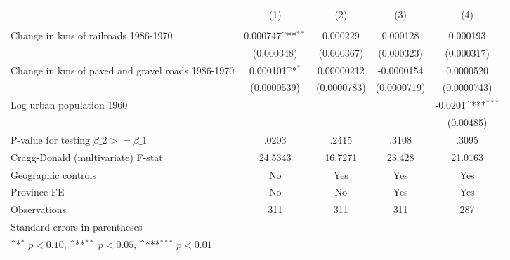 {
\def\sym#1{\ifmmode^{#1}\else\(^{#1}\)\fi}
\begin{tabular}{l*{4}{c}}
\hline\hline
                &\multicolumn{1}{c}{(1)}&\multicolumn{1}{c}{(2)}&\multicolumn{1}{c}{(3)}&\multicolumn{1}{c}{(4)}\\
                &\multicolumn{1}{c}{}&\multicolumn{1}{c}{}&\multicolumn{1}{c}{}&\multicolumn{1}{c}{}\\
\hline
Change in kms of railroads 1986-1970& 0.000747\sym{**} & 0.000229         & 0.000128         & 0.000193         \\
                &(0.000348)         &(0.000367)         &(0.000323)         &(0.000317)         \\
[1em]
Change in kms of paved and gravel roads 1986-1970& 0.000101\sym{*}  &0.00000212         &-0.0000154         &0.0000520         \\
                &(0.0000539)         &(0.0000783)         &(0.0000719)         &(0.0000743)         \\
[1em]
Log urban population 1960&                  &                  &                  &  -0.0201\sym{***}\\
                &                  &                  &                  &(0.00485)         \\
\hline
P-value for testing $\beta\_{2} >= \beta\_{1}$&    .0203         &    .2415         &    .3108         &    .3095         \\
Cragg-Donald (multivariate) F-stat&  24.5343         &  16.7271         &   23.428         &  21.0163         \\
Geographic controls&       No         &      Yes         &      Yes         &      Yes         \\
Province FE     &       No         &       No         &      Yes         &      Yes         \\
Observations    &      311         &      311         &      311         &      287         \\
\hline\hline
\multicolumn{5}{l}{\footnotesize Standard errors in parentheses}\\
\multicolumn{5}{l}{\footnotesize \sym{*} \(p<0.10\), \sym{**} \(p<0.05\), \sym{***} \(p<0.01\)}\\
\end{tabular}
}
